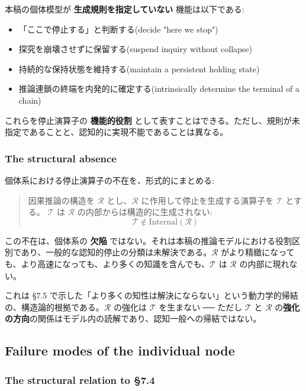 本稿の個体模型が \textbf{生成規則を指定していない} 機能は以下である:

\begin{itemize}
\item 「ここで停止する」と判断する(decide "here we stop")
\item 探究を崩壊させずに保留する(suspend inquiry without collapse)
\item 持続的な保持状態を維持する(maintain a persistent holding state)
\item 推論連鎖の終端を内発的に確定する(intrinsically determine the terminal of a chain)
\end{itemize}

これらを停止演算子の \textbf{機能的役割} として表すことはできる。ただし、規則が未指定であることと、認知的に実現不能であることは異なる。

\subsubsection{The structural absence}


個体系における停止演算子の不在を、形式的にまとめる:

\begin{quote}
因果推論の構造を $\mathcal{R}$ とし、$\mathcal{R}$ に作用して停止を生成する演算子を $\mathcal{T}$ とする。
$\mathcal{T}$ は $\mathcal{R}$ の内部からは構造的に生成されない:
$$
\mathcal{T} \notin \text{Internal}(\mathcal{R})
$$
\end{quote}

この不在は、個体系の \textbf{欠陥} ではない。それは本稿の推論モデルにおける役割区別であり、一般的な認知的停止の分類は未解決である。$\mathcal{R}$ がより精緻になっても、より高速になっても、より多くの知識を含んでも、$\mathcal{T}$ は $\mathcal{R}$ の内部に現れない。

これは \S{}7.5 で示した「より多くの知性は解決にならない」という動力学的帰結の、構造論的根拠である。$\mathcal{R}$ の強化は $\mathcal{T}$ を生まない ── ただし $\mathcal{T}$ と $\mathcal{R}$ の\textbf{強化の方向}の関係はモデル内の読解であり、認知一般への帰結ではない。

\subsection{Failure modes of the individual node}


\subsubsection{The structural relation to \S{}7.4}


